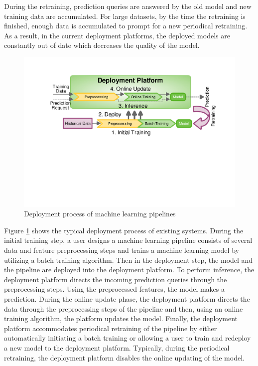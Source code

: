 During the retraining, prediction queries are answered by the old model and new training data are accumulated.
For large datasets, by the time the retraining is finished, enough data is accumulated to prompt for a new periodical retraining.
As a result, in the current deployment platforms, the deployed models are constantly out of date which decreases the quality of the model.

\begin{figure}[h!]
\centering
\includegraphics[width=\columnwidth]{../images/generic-motivational-example-v2.pdf}
\caption{Deployment process of machine learning pipelines}
\label{fig:motivational-example}
\end{figure}

Figure \ref{fig:motivational-example} shows the typical deployment process of existing systems.
During the initial training step, a user designs a machine learning pipeline consists of several data and feature preprocessing steps and trains a machine learning model by utilizing a batch training algorithm.
Then in the deployment step, the model and the pipeline are deployed into the deployment platform.
To perform inference, the deployment platform directs the incoming prediction queries through the preprocessing steps.
Using the preprocessed features, the model makes a prediction.
During the online update phase, the deployment platform directs the data through the preprocessing steps of the pipeline and then, using an online training algorithm, the platform updates the model.
Finally, the deployment platform accommodates periodical retraining of the pipeline by either automatically initiating a batch training or allowing a user to train and redeploy a new model to the deployment platform.
Typically, during the periodical retraining, the deployment platform disables the online updating of the model.

